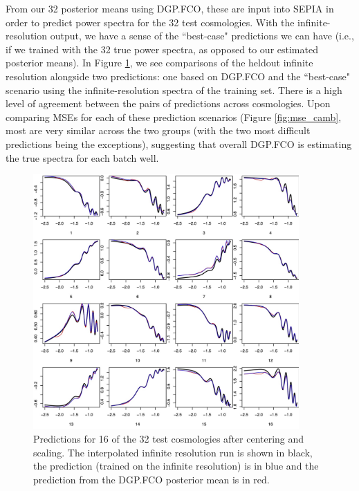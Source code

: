 \documentclass[11pt]{article}
\begin{document}
From our 32 posterior means using DGP.FCO, these are input into SEPIA in order to predict power spectra
for the 32 test cosmologies. With the infinite-resolution output, we have a sense of the ``best-case" 
predictions we can have (i.e., if we trained with the 32 true power spectra, as opposed to our 
estimated posterior means). In Figure \ref{fig:pca_preds_v_camb}, we see comparisons of the heldout 
infinite resolution alongside two predictions: one based on DGP.FCO and the ``best-case" scenario using the
infinite-resolution spectra of the training set. There is a high level of agreement between the pairs
of predictions across cosmologies. Upon comparing MSEs for each of these prediction scenarios 
(Figure \ref{fig:mse_camb}, most are very similar across the two groups (with the two most difficult 
predictions being the exceptions), suggesting that overall DGP.FCO is estimating the true spectra 
for each batch well.

\begin{figure}
    \centering
    \includegraphics[width=4in]{preds_diff1_4_8.jpg}
    \caption{Predictions for 16 of the 32 test cosmologies after centering and scaling. 
             The interpolated infinite resolution run is shown in black, the prediction 
             (trained on the infinite resolution) is in blue and the prediction from 
             the DGP.FCO posterior mean is in red.}   
    \label{fig:pca_preds_v_camb}
\end{figure}
\end{document}
